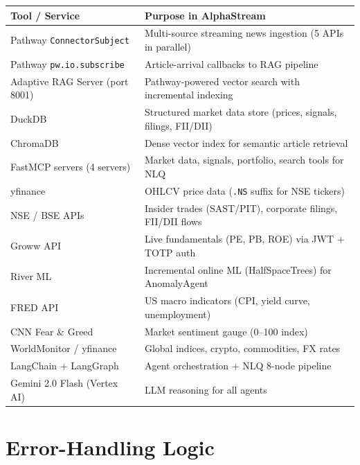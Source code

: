 \documentclass[11pt, a4paper]{article}
\begin{document}
\begin{center}
\small
\begin{tabular}{L{4.5cm} L{9cm}}
  \toprule
  \textbf{Tool / Service} & \textbf{Purpose in AlphaStream} \\
  \midrule
  Pathway \texttt{ConnectorSubject} & Multi-source streaming news ingestion (5 APIs in parallel) \\
  Pathway \texttt{pw.io.subscribe} & Article-arrival callbacks to RAG pipeline \\
  Adaptive RAG Server (port 8001) & Pathway-powered vector search with incremental indexing \\
  DuckDB & Structured market data store (prices, signals, filings, FII/DII) \\
  ChromaDB & Dense vector index for semantic article retrieval \\
  FastMCP servers (4 servers) & Market data, signals, portfolio, search tools for NLQ \\
  yfinance & OHLCV price data (\texttt{.NS} suffix for NSE tickers) \\
  NSE / BSE APIs & Insider trades (SAST/PIT), corporate filings, FII/DII flows \\
  Groww API & Live fundamentals (PE, PB, ROE) via JWT + TOTP auth \\
  River ML & Incremental online ML (HalfSpaceTrees) for AnomalyAgent \\
  FRED API & US macro indicators (CPI, yield curve, unemployment) \\
  CNN Fear \& Greed & Market sentiment gauge (0--100 index) \\
  WorldMonitor / yfinance & Global indices, crypto, commodities, FX rates \\
  LangChain + LangGraph & Agent orchestration + NLQ 8-node pipeline \\
  Gemini 2.0 Flash (Vertex AI) & LLM reasoning for all agents \\
  \bottomrule
\end{tabular}
\end{center}

\section{Error-Handling Logic}
\end{document}
